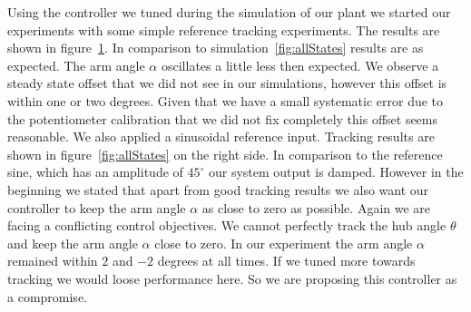 \documentclass[ twoside,openright,titlepage,numbers=noenddot,headinclude,%
                footinclude=true,cleardoublepage=empty,abstractoff, %
                BCOR=5mm,paper=a4,fontsize=11pt,%
                ngerman,american,%
                ]{scrreprt}
\begin{document}
{\begin{figure}
\label{fig:setPoint}
\end{figure}
Using the controller we tuned during the simulation of our plant we started our experiments with some simple reference tracking experiments. The results are shown in figure~\ref{fig:setPoint}. In comparison to simulation~\ref{fig:allStates} results are as expected. The arm angle $\alpha$ oscillates a little less then expected. We observe a steady state offset that we did not see in our simulations, however this offset is within one or two degrees. Given that we have a small systematic error due to the potentiometer calibration that we did not fix completely this offset seems reasonable. We also applied a sinusoidal reference input. Tracking results are shown in figure~\ref{fig:allStates} on the right side. In comparison to the reference sine, which has an amplitude of $45^\circ$ our system output is damped. However in the beginning we stated that apart from good tracking results we also want our controller to keep the arm angle $\alpha$ as close to zero as possible. Again we are facing a conflicting control objectives. We cannot perfectly track the hub angle $\theta$ and keep the arm angle $\alpha$ close to zero. In our experiment the arm angle $\alpha$ remained within $2$ and $-2$ degrees at all times. If we tuned more towards tracking we would loose performance here. So we are proposing this controller as a compromise. 

}
\end{document}
